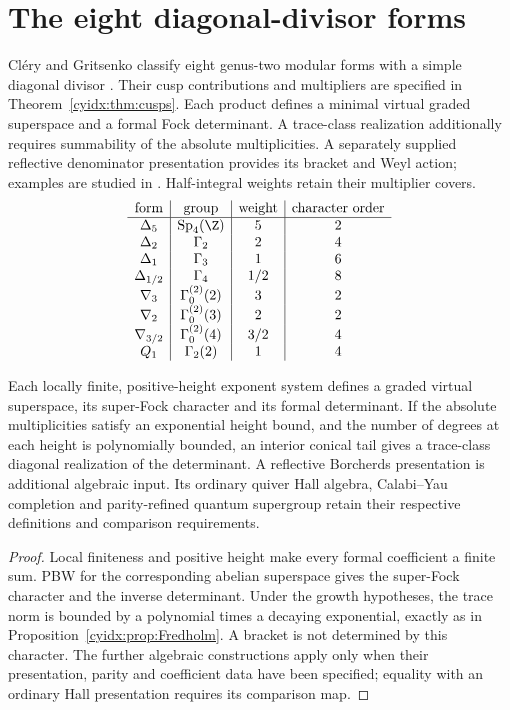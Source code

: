 \chapter{The eight diagonal-divisor forms}
Cl\'ery and Gritsenko classify eight genus-two modular
forms with a simple diagonal divisor \cite{GC}.
Their cusp contributions and multipliers are specified
in Theorem~\ref{cyidx:thm:cusps}. Each product defines
a minimal virtual graded superspace and a formal Fock
determinant. A trace-class realization additionally
requires summability of the absolute multiplicities.
A separately supplied reflective denominator presentation
provides its bracket and Weyl action; examples are studied
in \cite{GN97,GN98a,GN98b,GovindarajanKrishna2009,Govindarajan2011,GovindarajanSamanta2019}.
Half-integral weights retain their multiplier covers.
\[
\begin{array}{c|c|c|c}
\text{form}&\text{group}&\text{weight}&\text{character order}\\ \hline
\Delta_5&\operatorname{Sp}_4(\Z)&5&2\\
\Delta_2&\Gamma_2&2&4\\
\Delta_1&\Gamma_3&1&6\\
\Delta_{1/2}&\Gamma_4&1/2&8\\
\nabla_3&\Gamma^{(2)}_0(2)&3&2\\
\nabla_2&\Gamma^{(2)}_0(3)&2&2\\
\nabla_{3/2}&\Gamma^{(2)}_0(4)&3/2&4\\
Q_1&\Gamma_2(2)&1&4
\end{array}
\]

\begin{theorem}
Each locally finite, positive-height exponent system
defines a graded virtual superspace, its super-Fock
character and its formal determinant. If the absolute
multiplicities satisfy an exponential height bound,
and the number of degrees at each height is polynomially
bounded, an interior conical tail gives a trace-class
diagonal realization of the determinant.
A reflective Borcherds presentation is additional
algebraic input. Its ordinary quiver Hall algebra,
Calabi--Yau completion and parity-refined quantum
supergroup retain their respective definitions and
comparison requirements.
\end{theorem}
\begin{proof}
Local finiteness and positive height make every formal
coefficient a finite sum. PBW for the corresponding
abelian superspace gives the super-Fock character and
the inverse determinant. Under the growth hypotheses,
the trace norm is bounded by a polynomial times a
decaying exponential, exactly as in
Proposition~\ref{cyidx:prop:Fredholm}.
A bracket is not determined by this character.
The further algebraic constructions apply only when
their presentation, parity and coefficient data have
been specified; equality with an ordinary Hall
presentation requires its comparison map.
\end{proof}

